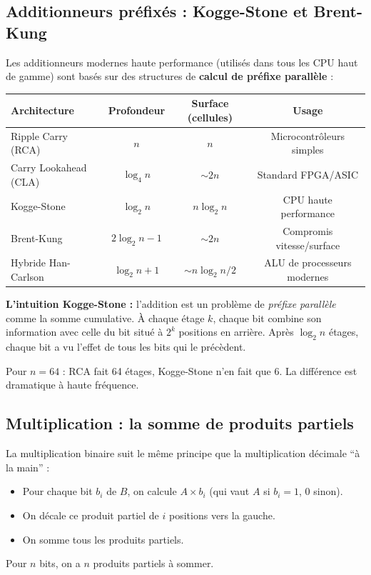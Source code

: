 \documentclass[12pt,a4paper,twoside]{book}
\begin{document}
\subsection{Additionneurs préfixés : Kogge-Stone et Brent-Kung}

\begin{formule}
Les additionneurs modernes haute performance (utilisés dans tous les CPU haut de gamme) sont basés sur des structures de \textbf{calcul de préfixe parallèle} :

\begin{center}
\renewcommand{\arraystretch}{1.4}
\begin{tabular}{lccc}
\toprule
\textbf{Architecture} & \textbf{Profondeur} & \textbf{Surface (cellules)} & \textbf{Usage} \\
\midrule
Ripple Carry (RCA) & $n$ & $n$ & Microcontrôleurs simples \\
Carry Lookahead (CLA) & $\log_4 n$ & $\sim 2n$ & Standard FPGA/ASIC \\
Kogge-Stone & $\log_2 n$ & $n\log_2 n$ & CPU haute performance \\
Brent-Kung & $2\log_2 n - 1$ & $\sim 2n$ & Compromis vitesse/surface \\
Hybride Han-Carlson & $\log_2 n + 1$ & $\sim n\log_2 n / 2$ & ALU de processeurs modernes \\
\bottomrule
\end{tabular}
\end{center}
\end{formule}

\begin{intuition}
\textbf{L'intuition Kogge-Stone :} l'addition est un problème de \textit{préfixe parallèle} comme la somme cumulative. À chaque étage $k$, chaque bit combine son information avec celle du bit situé à $2^k$ positions en arrière. Après $\log_2 n$ étages, chaque bit a vu l'effet de tous les bits qui le précèdent.

Pour $n = 64$ : RCA fait 64 étages, Kogge-Stone n'en fait que 6. La différence est dramatique à haute fréquence.
\end{intuition}

\subsection{Multiplication : la somme de produits partiels}

\begin{formule}
La multiplication binaire suit le même principe que la multiplication décimale ``à la main'' :
\begin{itemize}[nosep]
\item Pour chaque bit $b_i$ de $B$, on calcule $A \times b_i$ (qui vaut $A$ si $b_i = 1$, $0$ sinon).
\item On décale ce produit partiel de $i$ positions vers la gauche.
\item On somme tous les produits partiels.
\end{itemize}

Pour $n$ bits, on a $n$ produits partiels à sommer.
\end{formule}
\end{document}

